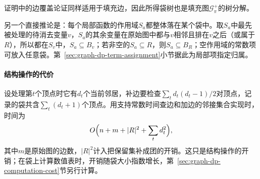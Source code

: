证明中的边覆盖论证同样适用于填充边，因此所得袋树也是填充图$\mathcal G^+_\pi$的树分解。

另一个直接推论是：每个局部函数的作用域$S_a$都整体落在某个袋中。取$S_a$中最先被处理的待消去变量$v$，$S_a$的其余变量在原始图中都与$v$相邻且排在$v$之后（或属于$R$），所以都在$S_v$中，$S_a\subseteq B_v$；若非空的$S_a\subseteq R$，则$S_a\subseteq B_R$；空作用域的常数项可放入任意袋。第~\ref{sec:graph-dp-term-assignment}小节据此为局部项指定归属。

\paragraph{结构操作的代价}
设处理第$t$个顶点时它有$d_t$个当前邻居，补边要检查$\sum_t d_t(d_t-1)/2$对顶点，记录的袋共含$\sum_t(d_t+1)$个顶点。用支持常数时间查边和加边的邻接集合实现时，时间为
\[
O\Bigl(n+m+|R|^2+\sum_t d_t^2\Bigr),
\]
其中$m$是原始图的边数，$|R|^2$计入把保留集补成团的开销。这只是结构操作的开销；在袋上计算数值表时，开销随袋大小指数增长，第~\ref{sec:graph-dp-computation-cost}节另行计算。
